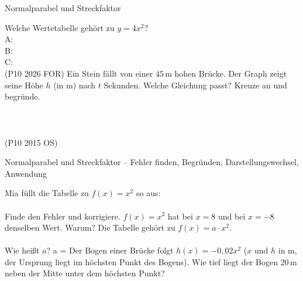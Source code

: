 \begin{aufgabe}{Normalparabel und Streckfaktor}
\begin{teile}
\begin{ksys}[xmin=-4,xmax=4,ymin=-5,ymax=5,ablesen]
\end{ksys}
\teil Welche Wertetabelle gehört zu $y = 4x^2$? \\ A:  \\ B:  \\ C:  \\    \hfill (P10 2026 FOR)
\teil Ein Stein fällt von einer $45\,$m hohen Brücke. Der Graph zeigt seine Höhe $h$ (in m) nach $t$ Sekunden. Welche Gleichung passt? Kreuze an und begründe. \\  \\  \\  \\  \hfill (P10 2015 OS)

\begin{ksys}[xmin=0,xmax=4,ymin=0,ymax=50,xstep=0.5,ystep=5,xlabel=$t$ in s,ylabel=$h$ in m,ablesen]
\end{ksys}
\end{teile}
\end{aufgabe}

\begin{aufgabe}{Normalparabel und Streckfaktor – Fehler finden, Begründen, Darstellungswechsel, Anwendung}
\begin{teile}
\teil Mia füllt die Tabelle zu $f(x) = x^2$ so aus: \\  \\ Finde den Fehler und korrigiere.
\teil $f(x) = x^2$ hat bei $x = 8$ und bei $x = -8$ denselben Wert. Warum?
\teil Die Tabelle gehört zu $f(x) = a \cdot x^2$. \\  \\ Wie heißt $a$? a = \leerfeld
\teil Der Bogen einer Brücke folgt $h(x) = -0{,}02x^2$ ($x$ und $h$ in m, der Ursprung liegt im höchsten Punkt des Bogens). Wie tief liegt der Bogen $20\,$m neben der Mitte unter dem höchsten Punkt?

\begin{ksys}[xmin=-30,xmax=30,ymin=-20,ymax=5,xstep=10,ystep=5,xlabel=$x$ in m,ylabel=$h$ in m]
\end{ksys}
\leerfeld[m]
\end{teile}
\end{aufgabe}
